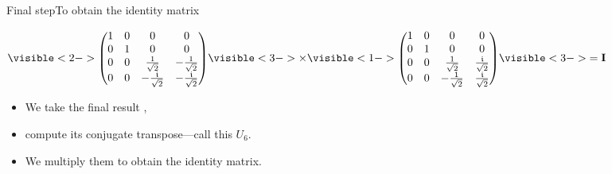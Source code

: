 {{\begin{frame}{Final step}{To obtain the identity matrix}
\begin{center}
$\visible<2->{\begin{pmatrix*}
\FinalConjTranspose
\end{pmatrix*}}\visible<3->{\times} \visible<1->{\begin{pmatrix*}\UeUdUcUbUaU\end{pmatrix*}}\visible<3->{=\Identity}$\end{center}
\begin{itemize}
    \item<1-> We take the final result \NextName{},
    \item<2-> compute its conjugate transpose---call this $U_6$.
    \item<3-> We multiply them to obtain the identity matrix.
\end{itemize}




\end{frame}}




}